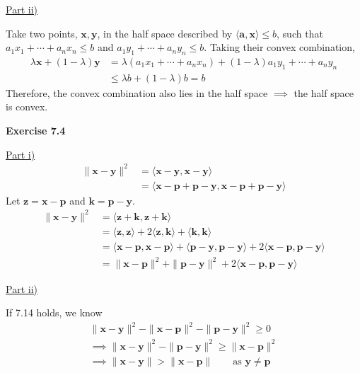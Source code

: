 \documentclass[letterpaper,12pt]{article}
\newcommand{\vect}[1]{\mathbf{#1}}
\begin{document}
\underline{Part ii)}

Take two points, $\vect{x}, \vect{y}$, in the half space described by $\langle \vect{a}, \vect{x} \rangle \leq b$, such that $a_1x_1 + \cdots + a_nx_n \leq b$ and $a_1y_1 + \cdots + a_ny_n \leq b$. Taking their convex combination,
\begin{align*}
\lambda \vect{x} + (1 - \lambda) \vect{y} &= \lambda (a_1x_1 + \cdots + a_nx_n) + (1 - \lambda) a_1y_1 + \cdots + a_ny_n \\ & \leq \lambda b + (1 - \lambda) b = b
\end{align*}
Therefore, the convex combination also lies in the half space $\implies$ the half space is convex.

\textbf{Exercise 7.4}

\underline{Part i)}
\begin{align*}
\|\vect{x} - \vect{y}\|^2 &= \langle \vect{x} - \vect{y}, \vect{x} - \vect{y} \rangle \\
&= \langle \vect{x} - \vect{p} + \vect{p} - \vect{y}, \vect{x} - \vect{p} + \vect{p} - \vect{y} \rangle
\end{align*}
Let $\vect{z} = \vect{x} - \vect{p}$ and $\vect{k} = \vect{p} - \vect{y}$.
\begin{align*}
\|\vect{x} - \vect{y}\|^2 &= \langle \vect{z} + \vect{k}, \vect{z} + \vect{k} \rangle \\
&= \langle \vect{z}, \vect{z} \rangle + 2 \langle \vect{z}, \vect{k} \rangle + \langle \vect{k}, \vect{k} \rangle \\
&= \langle \vect{x} - \vect{p}, \vect{x} - \vect{p} \rangle + \langle \vect{p} - \vect{y}, \vect{p} - \vect{y} \rangle + 2 \langle \vect{x} - \vect{p}, \vect{p} - \vect{y} \rangle \\
&= \|\vect{x} - \vect{p}\|^2 + \|\vect{p} - \vect{y}\|^2 + 2 \langle \vect{x} - \vect{p}, \vect{p} - \vect{y} \rangle
\end{align*}

\underline{Part ii)}

If 7.14 holds, we know
\begin{align*}
\| \vect{x} - \vect{y} \|^2 - \|\vect{x} - \vect{p} \|^2 - \| \vect{p} - \vect{y} \|^2 \geq 0 \\
\implies \| \vect{x} - \vect{y} \|^2 - \| \vect{p} - \vect{y} \|^2 \geq \|\vect{x} - \vect{p} \|^2 \\
\implies \| \vect{x} - \vect{y} \| > \|\vect{x} - \vect{p} \| \quad \quad \text{as } \vect{y} \neq \vect{p}
\end{align*}
\end{document}
